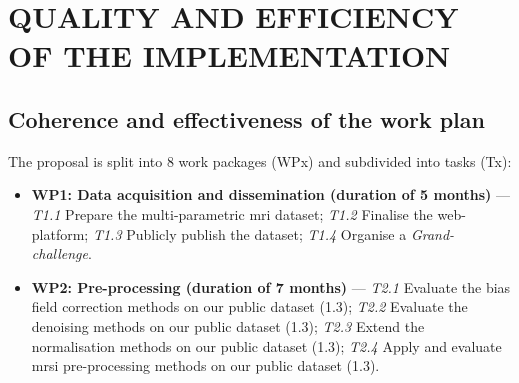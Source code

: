 \section{QUALITY AND EFFICIENCY OF THE IMPLEMENTATION}
\label{sec:implementation}

\subsection{Coherence and effectiveness of the work plan}

The proposal is split into 8 work packages (WPx) and subdivided into tasks (Tx):

\begin{itemize}[noitemsep]
\item[] \textbf{WP1: Data acquisition and dissemination (duration of 5 months)} ---
  \textit{T1.1} Prepare the multi-parametric \ac{mri} dataset;
  \textit{T1.2} Finalise the web-platform;
  \textit{T1.3} Publicly publish the dataset;
  \textit{T1.4} Organise a \emph{Grand-challenge}.
\item[] \textbf{WP2: Pre-processing (duration of 7 months)} ---
  \textit{T2.1} Evaluate the bias field correction methods on our public dataset (1.3);
  \textit{T2.2} Evaluate the denoising methods on our public dataset (1.3);
  \textit{T2.3} Extend the normalisation methods on our public dataset (1.3);
  \textit{T2.4} Apply and evaluate \ac{mrsi} pre-processing methods on our public dataset (1.3).

\end{itemize}
